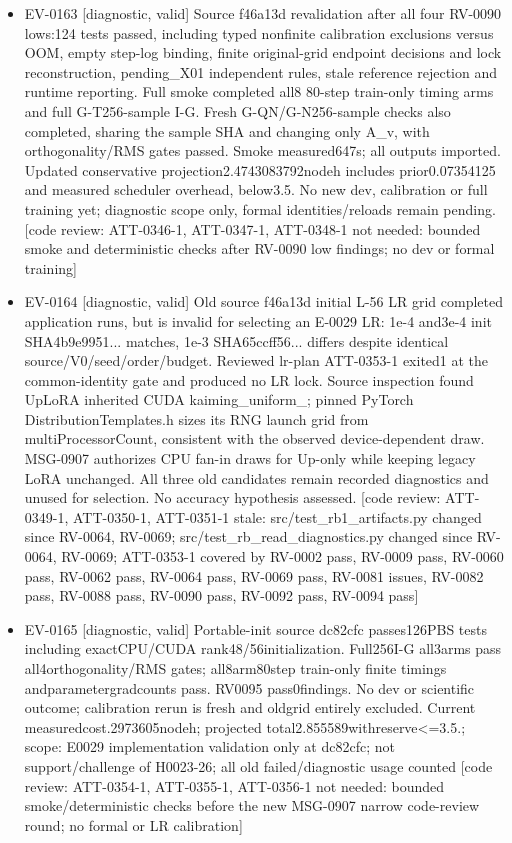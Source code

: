 \documentclass[11pt]{article}
\begin{document}
\begin{itemize}
\item EV-0163 [diagnostic, valid] Source f46a13d revalidation after all four RV-0090 lows:124 tests passed, including typed nonfinite calibration exclusions versus OOM, empty step-log binding, finite original-grid endpoint decisions and lock reconstruction, pending\_X01 independent rules, stale reference rejection and runtime reporting. Full smoke completed all8 80-step train-only timing arms and full G-T256-sample I-G. Fresh G-QN/G-N256-sample checks also completed, sharing the sample SHA and changing only A\_v, with orthogonality/RMS gates passed. Smoke measured647s; all outputs imported. Updated conservative projection2.4743083792nodeh includes prior0.07354125 and measured scheduler overhead, below3.5. No new dev, calibration or full training yet; diagnostic scope only, formal identities/reloads remain pending. [code review: ATT-0346-1, ATT-0347-1, ATT-0348-1 not needed: bounded smoke and deterministic checks after RV-0090 low findings; no dev or formal training]
\item EV-0164 [diagnostic, valid] Old source f46a13d initial L-56 LR grid completed application runs, but is invalid for selecting an E-0029 LR: 1e-4 and3e-4 init SHA4b9e9951... matches, 1e-3 SHA65ccff56... differs despite identical source/V0/seed/order/budget. Reviewed lr-plan ATT-0353-1 exited1 at the common-identity gate and produced no LR lock. Source inspection found UpLoRA inherited CUDA kaiming\_uniform\_; pinned PyTorch DistributionTemplates.h sizes its RNG launch grid from multiProcessorCount, consistent with the observed device-dependent draw. MSG-0907 authorizes CPU fan-in draws for Up-only while keeping legacy LoRA unchanged. All three old candidates remain recorded diagnostics and unused for selection. No accuracy hypothesis assessed. [code review: ATT-0349-1, ATT-0350-1, ATT-0351-1 stale: src/test\_rb1\_artifacts.py changed since RV-0064, RV-0069; src/test\_rb\_read\_diagnostics.py changed since RV-0064, RV-0069; ATT-0353-1 covered by RV-0002 pass, RV-0009 pass, RV-0060 pass, RV-0062 pass, RV-0064 pass, RV-0069 pass, RV-0081 issues, RV-0082 pass, RV-0088 pass, RV-0090 pass, RV-0092 pass, RV-0094 pass]
\item EV-0165 [diagnostic, valid] Portable-init source dc82cfc passes126PBS tests including exactCPU/CUDA rank48/56initialization. Full256I-G all3arms pass all4orthogonality/RMS gates; all8arm80step train-only finite timings andparametergradcounts pass. RV0095 pass0findings. No dev or scientific outcome; calibration rerun is fresh and oldgrid entirely excluded. Current measuredcost.2973605nodeh; projected total2.855589withreserve\textless{}=3.5.; scope: E0029 implementation validation only at dc82cfc; not support/challenge of H0023-26; all old failed/diagnostic usage counted [code review: ATT-0354-1, ATT-0355-1, ATT-0356-1 not needed: bounded smoke/deterministic checks before the new MSG-0907 narrow code-review round; no formal or LR calibration]

\end{itemize}
\end{document}
